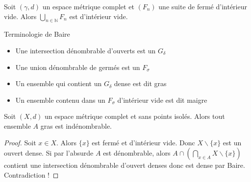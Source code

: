 \begin{corollaire}
    Soit $(\gamma,d)$ un espace métrique complet et $(F_n)$ une suite de fermé d'intérieur vide. Alors $\bigcup\limits_{n\in \mathbb{N} } F_n$ est d'intérieur vide.
\end{corollaire}

Terminologie de Baire
\begin{itemize}
    \item Une intersection dénombrable d'ouverts est un $G_{\delta}$
    \item Une union dénombrable de germés est un $F_\sigma$
    \item Un ensemble qui contient un $G_{\delta}$ dense est dit gras
    \item Un ensemble contenu dans un $F_\sigma$ d'intérieur vide est dit maigre
\end{itemize}

\begin{remarque}
    Soit $(X,d)$ un espace métrique complet et sans points isolés. Alors tout ensemble $A$ gras est indénombrable.
\end{remarque}
\begin{proof}
    Soit $x\in X$. Alors $\{x\} $ est fermé et d'intérieur vide. Donc $X\backslash \{x\} $ est un ouvert dense. Si par l'absurde $A$ est dénombrable, alors $A\cap \left( \bigcap\limits_{x\in A} X\backslash \{x\}  \right) $ contient une intersection dénombrable d'ouvert denses donc est dense par Baire. Contradiction !
\end{proof}

